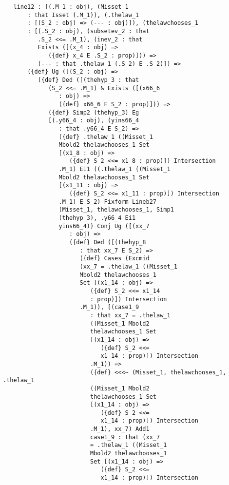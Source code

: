 \documentclass{article}
\begin{document}
\begin{verbatim}
   line12 : [(.M_1 : obj), (Misset_1 
       : that Isset (.M_1)), (.thelaw_1 
       : [(S_2 : obj) => (--- : obj)]), (thelawchooses_1 
       : [(.S_2 : obj), (subsetev_2 : that 
          .S_2 <<= .M_1), (inev_2 : that 
          Exists ([(x_4 : obj) => 
             ({def} x_4 E .S_2 : prop)])) => 
          (--- : that .thelaw_1 (.S_2) E .S_2)]) => 
       ({def} Ug ([(S_2 : obj) => 
          ({def} Ded ([(thehyp_3 : that 
             (S_2 <<= .M_1) & Exists ([(x66_6 
                : obj) => 
                ({def} x66_6 E S_2 : prop)])) => 
             ({def} Simp2 (thehyp_3) Eg 
             [(.y66_4 : obj), (yins66_4 
                : that .y66_4 E S_2) => 
                ({def} .thelaw_1 ((Misset_1 
                Mbold2 thelawchooses_1 Set 
                [(x1_8 : obj) => 
                   ({def} S_2 <<= x1_8 : prop)]) Intersection 
                .M_1) Ei1 ((.thelaw_1 ((Misset_1 
                Mbold2 thelawchooses_1 Set 
                [(x1_11 : obj) => 
                   ({def} S_2 <<= x1_11 : prop)]) Intersection 
                .M_1) E S_2) Fixform Lineb27 
                (Misset_1, thelawchooses_1, Simp1 
                (thehyp_3), .y66_4 Ei1 
                yins66_4)) Conj Ug ([(xx_7 
                   : obj) => 
                   ({def} Ded ([(thehyp_8 
                      : that xx_7 E S_2) => 
                      ({def} Cases (Excmid 
                      (xx_7 = .thelaw_1 ((Misset_1 
                      Mbold2 thelawchooses_1 
                      Set [(x1_14 : obj) => 
                         ({def} S_2 <<= x1_14 
                         : prop)]) Intersection 
                      .M_1)), [(case1_9 
                         : that xx_7 = .thelaw_1 
                         ((Misset_1 Mbold2 
                         thelawchooses_1 Set 
                         [(x1_14 : obj) => 
                            ({def} S_2 <<= 
                            x1_14 : prop)]) Intersection 
                         .M_1)) => 
                         ({def} <<<~ (Misset_1, thelawchooses_1, .thelaw_1 
                         ((Misset_1 Mbold2 
                         thelawchooses_1 Set 
                         [(x1_14 : obj) => 
                            ({def} S_2 <<= 
                            x1_14 : prop)]) Intersection 
                         .M_1), xx_7) Add1 
                         case1_9 : that (xx_7 
                         = .thelaw_1 ((Misset_1 
                         Mbold2 thelawchooses_1 
                         Set [(x1_14 : obj) => 
                            ({def} S_2 <<= 
                            x1_14 : prop)]) Intersection 

\end{verbatim}
\end{document}
